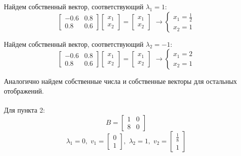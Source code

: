 \documentclass[a5paper, 10pt]{article}
\theoremstyle{definition}
\theoremstyle{plain}
\theoremstyle{remark}
\begin{document}
Найдем собственный вектор, соответствующий $\lambda_1 = 1$:
\begin{equation}
\begin{bmatrix}
-0.6 & 0.8\\
0.8 & 0.6
\end{bmatrix}
\begin{bmatrix}
x_1 \\
x_2
\end{bmatrix}
=
\begin{bmatrix}
x_1 \\
x_2
\end{bmatrix}
\, \, \to 
\begin{cases}
x_1 = \frac{1}{2} \\
x_2 = 1
\end{cases}
\end{equation}

Найдем собственный вектор, соответствующий $\lambda_2 = -1$:
\begin{equation}
\begin{bmatrix}
-0.6 & 0.8\\
0.8 & 0.6
\end{bmatrix}
\begin{bmatrix}
x_1 \\
x_2
\end{bmatrix}
=
\begin{bmatrix}
x_1 \\
x_2
\end{bmatrix}
\, \, \to 
\begin{cases}
x_1 = 2 \\
x_2 = 1
\end{cases}
\end{equation}

Аналогично найдем собственные числа  и собственные векторы для остальных отображений.\\
\\
Для пункта 2:
\begin{equation}
B =
\begin{bmatrix}
1 & 0\\
8 & 0
\end{bmatrix}
\end{equation}
\begin{equation}
\lambda_1 = 0, \, \,
v_1 =
\begin{bmatrix}
0\\
1
\end{bmatrix}
, \, \,
\lambda_2 = 1, \, \,
v_2 =
\begin{bmatrix}
\frac{1}{8}\\
1
\end{bmatrix}
\end{equation}
\\
\end{document}
